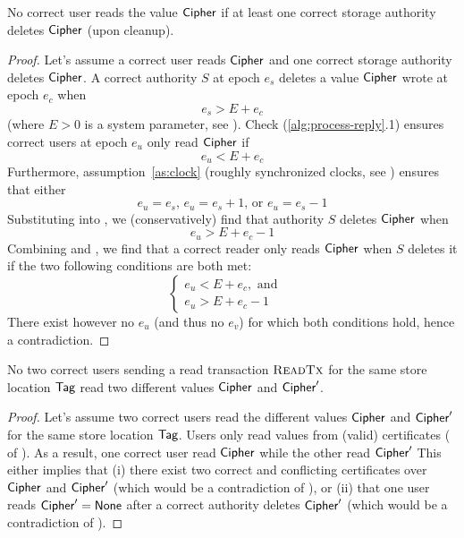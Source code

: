 \begin{lemma} \label{th:read-deletion}
    No correct user reads the value $\textsf{Cipher}$ if at least one correct storage authority deletes $\textsf{Cipher}$ (upon cleanup).
\end{lemma}
\begin{proof}
    Let's assume a correct user reads $\textsf{Cipher}$ and one correct storage authority deletes $\textsf{Cipher}$.
    A correct authority $S$ at epoch $e_s$ deletes a value $\textsf{Cipher}$ wrote at epoch $e_c$ when
    \begin{equation} \label{eq:delete-cond}
        e_s > E + e_c
    \end{equation}
    (where $E>0$ is a system parameter, see ).
    Check (\ref{alg:process-reply}.1) ensures correct users at epoch $e_u$ only read $\textsf{Cipher}$ if
    \begin{equation} \label{eq:read-cond}
        e_u < E + e_c
    \end{equation}
    Furthermore, assumption~\ref{as:clock} (roughly synchronized clocks, see ) ensures that either
    \begin{equation} \label{eq:clock-assumption}
        e_u = e_s \text{, } e_u = e_s + 1 \text{, or } e_u = e_s - 1
    \end{equation}
    Substituting  into , we (conservatively) find that authority $S$ deletes $\textsf{Cipher}$ when
    \begin{equation} \label{eq:delete-final-cond}
        e_u > E + e_c - 1
    \end{equation}
    Combining  and , we find that a correct reader only reads $\textsf{Cipher}$ when $S$ deletes it if the two following conditions are both met:
    $$
        \begin{cases}
            e_u < E + e_c,  \text{ and } & \\
            e_u > E + e_c - 1            &
        \end{cases}
    $$
    There exist however no $e_u$ (and thus no $e_v$) for which both conditions hold, hence a contradiction.
\end{proof}

\begin{theorem}
    No two correct users sending a read transaction $\textsc{ReadTx}$ for the same store location $\textsf{Tag}$ read two different values $\textsf{Cipher}$ and $\textsf{Cipher}'$.
\end{theorem}
\begin{proof}
    Let's assume two correct users read the different values $\textsf{Cipher}$ and $\textsf{Cipher}'$ for the same store location $\textsf{Tag}$.
    Users only read values from (valid) certificates ( of ). As a result, one correct user read $\textsf{Cipher}$ while the other read $\textsf{Cipher}'$
    This either implies that (i) there exist two correct and conflicting certificates over $\textsf{Cipher}$ and $\textsf{Cipher}'$ (which would be a contradiction of ), or (ii) that one user reads $\textsf{Cipher}'=\textsf{None}$ after a correct authority deletes $\textsf{Cipher}'$ (which would be a contradiction of ).
\end{proof}

